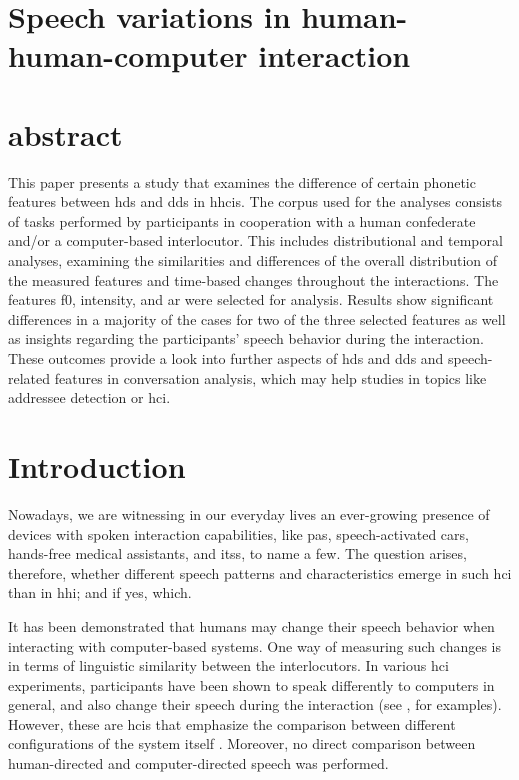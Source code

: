 \section{Speech variations in human-human-computer interaction}
\label{sec:speech_variations_in_hhci}


\section{abstract}

This paper presents a study that examines the difference of certain phonetic features between \acf{hds} and \acf{dds} in \acfp{hhci}.
The corpus used for the analyses consists of tasks performed by participants in cooperation with a human confederate and/or a computer-based interlocutor.
This includes distributional and temporal analyses, examining the similarities and differences of the overall distribution of the measured features and time-based changes throughout the interactions. 
The features \acl{f0}, intensity, and \acl{ar} were selected for analysis.
Results show significant differences in a majority of the cases for two of the three selected features as well as insights regarding the participants' speech behavior during the interaction.
These outcomes provide a look into further aspects of \ac{hds} and \ac{dds} and speech-related features in conversation analysis, which may help studies in topics like addressee detection or \ac{hci}.

\section{Introduction}
\label{sec:introduction}

Nowadays, we are witnessing in our everyday lives an ever-growing presence of devices with spoken interaction capabilities, like \acp{pa}, speech-activated cars, hands-free medical assistants, and \acp{its}, to name a few.
The question arises, therefore, whether different speech patterns and characteristics emerge in such \ac{hci} than in \ac{hhi}; and if yes, which.

It has been demonstrated that humans may change their speech behavior when interacting with computer-based systems.
One way of measuring such changes is in terms of linguistic similarity between the interlocutors.
In various \ac{hci} experiments, participants have been shown to speak differently to computers in general, and also change their speech during the interaction (see \citet{Branigan2010linguistic}, for examples).
However, these are \acp{hci}  that emphasize the comparison between different configurations of the system itself \citep[e.g.,][]{Levitan2016implementing}.
Moreover, no direct comparison between human-directed and computer-directed speech was performed.

